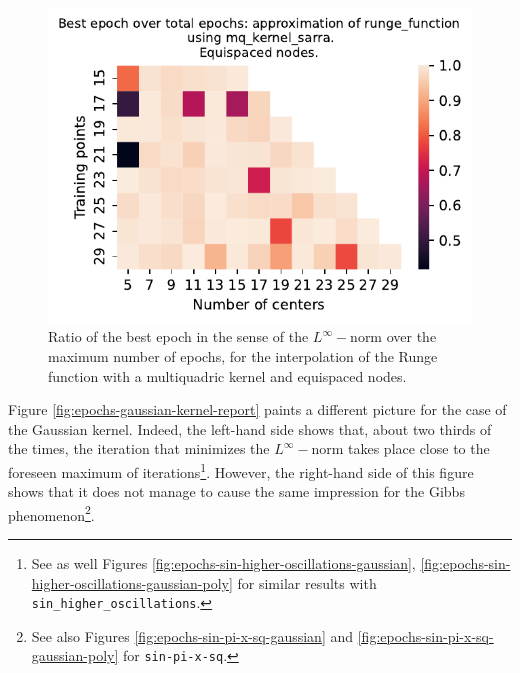 \documentclass[12pt]{report} %
\begin{document}
\begin{figure}[ht]
    \centering
    \includegraphics[width=.49\textwidth]{imagenes/experiments/1d/variational_epochs/runge_function-Kmq_kernel_sarra-Equi-epochs.pdf}
    \caption{Ratio of the best epoch in the sense of the $L^\infty-$norm over the maximum number of epochs, for the interpolation of the Runge function with a multiquadric kernel and equispaced nodes.}
    \label{fig:epochs-sarra-kernel-report}
\end{figure}


Figure \ref{fig:epochs-gaussian-kernel-report} paints a different picture for the case of the Gaussian kernel. Indeed, the left-hand side shows that, about two thirds of the times, the iteration that minimizes the $L^\infty-$norm takes place close to the foreseen maximum of iterations\footnote{See as well Figures \ref{fig:epochs-sin-higher-oscillations-gaussian}, \ref{fig:epochs-sin-higher-oscillations-gaussian-poly} for similar results with \texttt{sin\_higher\_oscillations}.}. However, the right-hand side of this figure shows that it does not manage to cause the same impression for the Gibbs phenomenon\footnote{See also Figures \ref{fig:epochs-sin-pi-x-sq-gaussian} and \ref{fig:epochs-sin-pi-x-sq-gaussian-poly} for \texttt{sin-pi-x-sq}.}.
\end{document}
